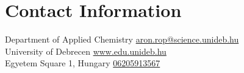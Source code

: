 \section{Contact Information}
Department of Applied Chemistry      \hfill \href{mailto:aron.rop@science.unideb.hu}{aron.rop@science.unideb.hu}\\
University of Debrecen   \hfill \href{https://www.edu.unideb.hu/}{www.edu.unideb.hu}\\
Egyetem Square 1, Hungary \hfill \href{tel:+36205913567}{06205913567}\\ 

